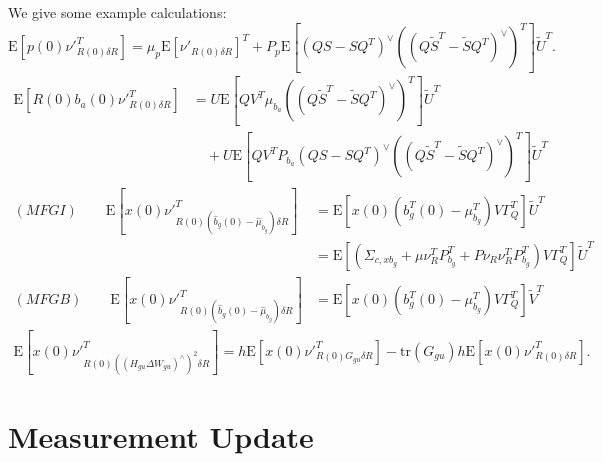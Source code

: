 \documentclass[10pt]{article}
\newcommand{\tr}[1]{\ensuremath{\mathrm{tr}\left( #1 \right)}}
\newcommand{\expect}[1]{\ensuremath{\mathrm{E}\left[ #1 \right]}}
\begin{document}
We give some example calculations:
\begin{equation}
	\expect{p(0)\nu'^T_{R(0)\delta R}} = \mu_p\expect{\nu'_{R(0)\delta R}}^T + P_p\expect{(QS-SQ^T)^\vee \left((Q\tilde{S}^T-\tilde{S}Q^T)^\vee\right)^T} \tilde{U}^T.
\end{equation}
\begin{align}
	\expect{R(0)b_a(0)\nu'^T_{R(0)\delta R}} &= U\expect{QV^T\mu_{b_a}\left((Q\tilde{S}^T-\tilde{S}Q^T)^\vee\right)^T}\tilde{U}^T \nonumber \\
	&\quad + U\expect{QV^TP_{b_a}(QS-SQ^T)^\vee \left((Q\tilde{S}^T-\tilde{S}Q^T)^\vee\right)^T} \tilde{U}^T
\end{align}
\begin{subequations}
	\begin{align}
		(MFGI) \qquad \expect{x(0)\nu'^T_{R(0)(\hat{b}_g(0)-\hat{\mu}_{b_g})\delta R}} &= \expect{x(0)\left( b_g^T(0) - \mu^T_{b_g} \right)V\Gamma_Q^T} \tilde{U}^T \nonumber \\
		&= \expect{\left( \Sigma_{c,xb_g} + \mu\nu^T_RP_{b_g}^T + P\nu_R\nu_R^TP_{b_g}^T\right)V\Gamma_Q^T} \tilde{U}^T \\
		(MFGB) \qquad \expect{x(0)\nu'^T_{R(0)(\hat{b}_g(0)-\hat{\mu}_{b_g})\delta R}} &= \expect{x(0)\left( b_g^T(0) - \mu^T_{b_g} \right)V\Gamma_Q^T} \tilde{V}^T
	\end{align}
\end{subequations}
\begin{align}
	\expect{x(0)\nu'^T_{R(0)((H_{gu}\Delta W_{gu})^\wedge)^2\delta R}} = h\expect{x(0)\nu'^T_{R(0)G_{gu}\delta R}} - \tr{G_{gu}}h\expect{x(0)\nu'^T_{R(0)\delta R}}.
\end{align}

\section{Measurement Update}
\end{document}
